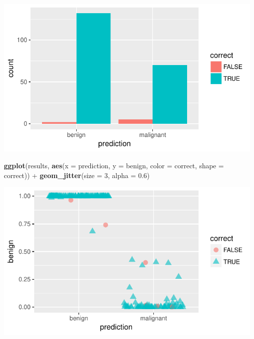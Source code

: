 \documentclass[]{article}
\newenvironment{Shaded}{\begin{snugshade}}{\end{snugshade}}
\newcommand{\KeywordTok}[1]{\textcolor[rgb]{0.13,0.29,0.53}{\textbf{{#1}}}}
\newcommand{\DataTypeTok}[1]{\textcolor[rgb]{0.13,0.29,0.53}{{#1}}}
\newcommand{\DecValTok}[1]{\textcolor[rgb]{0.00,0.00,0.81}{{#1}}}
\newcommand{\FloatTok}[1]{\textcolor[rgb]{0.00,0.00,0.81}{{#1}}}
\newcommand{\StringTok}[1]{\textcolor[rgb]{0.31,0.60,0.02}{{#1}}}
\newcommand{\NormalTok}[1]{{#1}}
\begin{document}
\begin{center}\includegraphics{webinar_code_files/figure-latex/results_bar_xgb-1} \end{center}

\begin{Shaded}
\begin{Highlighting}[]
\KeywordTok{ggplot}\NormalTok{(results, }\KeywordTok{aes}\NormalTok{(}\DataTypeTok{x =} \NormalTok{prediction, }\DataTypeTok{y =} \NormalTok{benign, }\DataTypeTok{color =} \NormalTok{correct, }\DataTypeTok{shape =} \NormalTok{correct)) +}
\StringTok{  }\KeywordTok{geom_jitter}\NormalTok{(}\DataTypeTok{size =} \DecValTok{3}\NormalTok{, }\DataTypeTok{alpha =} \FloatTok{0.6}\NormalTok{)}
\end{Highlighting}
\end{Shaded}

\begin{center}\includegraphics{webinar_code_files/figure-latex/results_jitter_xgb-1} \end{center}
\end{document}
